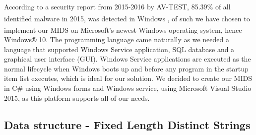 \documentclass[12pt]{article} %
\begin{document}
According to a security report from 2015-2016 by AV-TEST, 85.39\% of all identified malware in 2015, was detected in Windows \textsuperscript{\textregistered} \cite{avtestreport}, of such we have chosen to implement our MIDS on Microsoft’s newest Windows\textsuperscript{\textregistered} operating system, hence Windows® 10. The programming language came naturally as we needed a language that supported Windows Service application, SQL database and a graphical user interface (GUI). Windows Service applications are executed as the normal lifecycle when Windows boots up and before any program in the startup item list executes, which is ideal for our solution. We decided to create our MIDS in C# using Windows forms and Windows service, using Microsoft Visual Studio 2015, as this platform supports all of our needs.


\subsection{Data structure - Fixed Length Distinct Strings}
\end{document}
